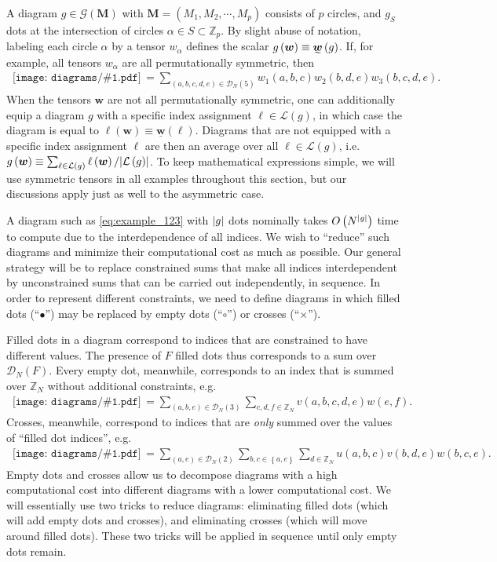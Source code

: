 \documentclass[nofootinbib,notitlepage,11pt]{revtex4-2}
\newcommand{\p}[1]{\left(#1\right)} %
\renewcommand{\set}[1]{\left\{#1\right\}} %
\newcommand{\m}{\bm} %
\newcommand{\1}{\mathds{1}}
\newcommand{\D}{\mathcal{D}}
\newcommand{\G}{\mathcal{G}}
\renewcommand{\L}{\mathcal{L}}
\newcommand{\ZZ}{\mathbb{Z}}
\newcommand{\ut}{\undertilde}
\newcommand{\col}{\underline}
\newcommand{\diagram}[1]
{\,\texttt{[image: diagrams/\#1.pdf]}\,}
\begin{document}
A diagram $g\in\G\p{\m M}$ with $\m M=\p{M_1,M_2,\cdots,M_p}$ consists
of $p$ circles, and $g_S$ dots at the intersection of circles
$\alpha\in S\subset\ZZ_p$.  By slight abuse of notation, labeling each
circle $\alpha$ by a tensor $w_\alpha$ defines the scalar
$g\p{\m w}\equiv\ut{\m w}\p{g}$.  If, for example, all tensors
$w_\alpha$ are all permutationally symmetric, then
\begin{align}
  \diagram{example_w123}
  = \sum_{\p{a,b,c,d,e}\in\D_N\p{5}}
  w_1\p{a,b,c} w_2\p{b,d,e} w_3\p{b,c,d,e}.
  \label{eq:example_123}
\end{align}
When the tensors $\m w$ are not all permutationally symmetric, one can
additionally equip a diagram $g$ with a specific index assignment
$\ell\in\L\p{g}$, in which case the diagram is equal to
$\ell\p{\m w}\equiv\col{\m w}\p{\ell}$.  Diagrams that are not
equipped with a specific index assignment $\ell$ are then an average
over all $\ell\in\L\p{g}$,
i.e.~$g\p{\m w}\equiv\sum_{\ell\in\L\p{g}} \ell\p{\m w} /
\abs{\L\p{g}}$.  To keep mathematical expressions simple, we will use
symmetric tensors in all examples throughout this section, but our
discussions apply just as well to the asymmetric case.

A diagram such as \eqref{eq:example_123} with $\abs{g}$ dots nominally
takes $O\p{N^{\abs{g}}}$ time to compute due to the interdependence of
all indices.  We wish to ``reduce'' such diagrams and minimize their
computational cost as much as possible.  Our general strategy will be
to replace constrained sums that make all indices interdependent by
unconstrained sums that can be carried out independently, in sequence.
In order to represent different constraints, we need to define
diagrams in which filled dots (``$\bullet$'') may be replaced by empty
dots (``$\circ$'') or crosses (``$\bm\times$'').

Filled dots in a diagram correspond to indices that are constrained to
have different values.  The presence of $F$ filled dots thus
corresponds to a sum over $\D_N\p{F}$.  Every empty dot, meanwhile,
corresponds to an index that is summed over $\ZZ_N$ without additional
constraints, e.g.
\begin{align}
  \diagram{example_o}
  = \sum_{\p{a,b,e}\in\D_N\p{3}} \sum_{c,d,f\in\ZZ_N}
  v\p{a,b,c,d,e} w\p{e,f}.
\end{align}
Crosses, meanwhile, correspond to indices that are {\it only} summed
over the values of ``filled dot indices'', e.g.
\begin{align}
  \diagram{example_x}
  = \sum_{\p{a,e}\in\D_N\p{2}} \sum_{b,c\in\set{a,e}} \sum_{d\in\ZZ_N}
  u\p{a,b,c} v\p{b,d,e} w\p{b,c,e}.
\end{align}
Empty dots and crosses allow us to decompose diagrams with a high
computational cost into different diagrams with a lower computational
cost.  We will essentially use two tricks to reduce diagrams:
eliminating filled dots (which will add empty dots and crosses), and
eliminating crosses (which will move around filled dots).  These two
tricks will be applied in sequence until only empty dots remain.
\end{document}
